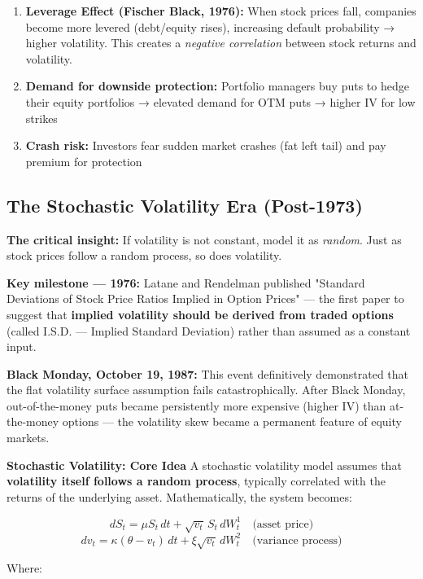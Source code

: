 \documentclass[12pt,openany]{book}
\theoremstyle{definition}
\theoremstyle{remark}
\begin{document}
\begin{enumerate}
\item \textbf{Leverage Effect (Fischer Black, 1976):} When stock prices fall, companies become more levered (debt/equity rises), increasing default probability → higher volatility. This creates a \emph{negative correlation} between stock returns and volatility.


\item \textbf{Demand for downside protection:} Portfolio managers buy puts to hedge their equity portfolios → elevated demand for OTM puts → higher IV for low strikes


\item \textbf{Crash risk:} Investors fear sudden market crashes (fat left tail) and pay premium for protection


\end{enumerate}
\medskip
\subsection{The Stochastic Volatility Era (Post-1973)}
\textbf{The critical insight:} If volatility is not constant, model it as \emph{random}. Just as stock prices follow a random process, so does volatility.

\textbf{Key milestone --- 1976:} Latane and Rendelman published "Standard Deviations of Stock Price Ratios Implied in Option Prices" --- the first paper to suggest that \textbf{implied volatility should be derived from traded options} (called I.S.D. --- Implied Standard Deviation) rather than assumed as a constant input.

\textbf{Black Monday, October 19, 1987:} This event definitively demonstrated that the flat volatility surface assumption fails catastrophically. After Black Monday, out-of-the-money puts became persistently more expensive (higher IV) than at-the-money options --- the volatility skew became a permanent feature of equity markets.

\textbf{Stochastic Volatility: Core Idea} A stochastic volatility model assumes that \textbf{volatility itself follows a random process}, typically correlated with the returns of the underlying asset. Mathematically, the system becomes:

\[
dS_t = \mu S_t \, dt + \sqrt{v_t} \, S_t \, dW_t^1 \quad \text{(asset price)}
\]
\[
dv_t = \kappa(\theta - v_t) \, dt + \xi\sqrt{v_t} \, dW_t^2 \quad \text{(variance process)}
\]

Where:
\end{document}
